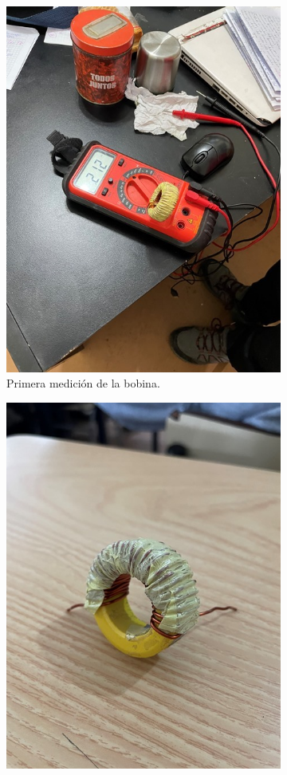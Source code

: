\begin{figure}[H]

\begin{subfigure}{0.5\textwidth}
\includegraphics[width=0.9\linewidth]{informes/IMG_8168.jpg} 
\caption{Primera medición de la bobina.}
\end{subfigure}
\begin{subfigure}{0.5\textwidth}
\includegraphics[width=0.9\linewidth]{informes/IMG_8180.jpg}

\end{subfigure}
\end{figure}
